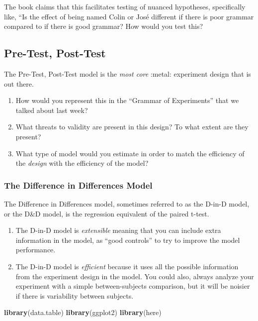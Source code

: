 \documentclass[
]{article}
\newenvironment{Shaded}{\begin{snugshade}}{\end{snugshade}}
\newcommand{\FunctionTok}[1]{\textcolor[rgb]{0.13,0.29,0.53}{\textbf{#1}}}
\newcommand{\NormalTok}[1]{#1}
\providecommand{\tightlist}{%
  \setlength{\itemsep}{0pt}\setlength{\parskip}{0pt}}
\theoremstyle{definition}
\theoremstyle{definition}
\theoremstyle{definition}
\theoremstyle{definition}
\theoremstyle{remark}
\begin{document}
The book claims that this facilitates testing of nuanced hypotheses, specifically like, ``Is the effect of being named Colin or José different if there is poor grammar compared to if there is good grammar? How would you test this?

\subsection{Pre-Test, Post-Test}\label{pre-test-post-test}

The Pre-Test, Post-Test model is the \emph{most core} :metal: experiment design that is out there.

\begin{enumerate}
\def\labelenumi{\arabic{enumi}.}
\tightlist
\item
  How would you represent this in the ``Grammar of Experiments'' that we talked about last week?
\item
  What threats to validity are present in this design? To what extent are they present?
\item
  What type of model would you estimate in order to match the efficiency of the \emph{design} with the efficiency of the model?
\end{enumerate}

\subsubsection{The Difference in Differences Model}\label{the-difference-in-differences-model}

The Difference in Differences model, sometimes referred to as the D-in-D model, or the D\&D model, is the regression equivalent of the paired t-test.

\begin{enumerate}
\def\labelenumi{\arabic{enumi}.}
\tightlist
\item
  The D-in-D model is \emph{extensible} meaning that you can include extra information in the model, as ``good controls'' to try to improve the model performance.
\item
  The D-in-D model is \emph{efficient} because it uses all the possible information from the experiment design in the model. You could also, always analyze your experiment with a simple between-subjects comparison, but it will be noisier if there is variability between subjects.
\end{enumerate}

\begin{Shaded}
\begin{Highlighting}[]
\FunctionTok{library}\NormalTok{(data.table)}
\FunctionTok{library}\NormalTok{(ggplot2)}
\FunctionTok{library}\NormalTok{(here)}
\end{Highlighting}
\end{Shaded}
\end{document}
